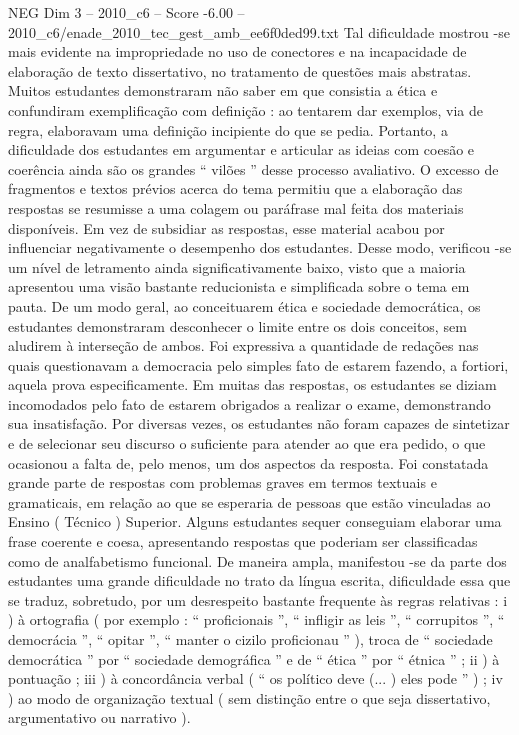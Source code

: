 \begin{textsample}{NEG Dim 3 – 2010\_c6 – Score -6.00 – 2010\_c6/enade\_2010\_tec\_gest\_amb\_ee6f0ded99.txt}
Tal dificuldade mostrou -se mais evidente na impropriedade no uso de conectores e na incapacidade de elaboração de texto dissertativo, no tratamento de questões mais abstratas.
Muitos estudantes demonstraram não saber em que consistia a ética e confundiram exemplificação com definição : ao tentarem dar exemplos, via de regra, elaboravam uma definição incipiente do que se pedia.
Portanto, a dificuldade dos estudantes em argumentar e articular as ideias com coesão e coerência ainda são os grandes “ vilões ” desse processo avaliativo.
O excesso de fragmentos e textos prévios acerca do tema permitiu que a elaboração das respostas se resumisse a uma colagem ou paráfrase mal feita dos materiais disponíveis.
Em vez de subsidiar as respostas, esse material acabou por influenciar negativamente o desempenho dos estudantes.
Desse modo, verificou -se um nível de letramento ainda significativamente baixo, visto que a maioria apresentou uma visão bastante reducionista e simplificada sobre o tema em pauta.
De um modo geral, ao conceituarem ética e sociedade democrática, os estudantes demonstraram desconhecer o limite entre os dois conceitos, sem aludirem à interseção de ambos.
Foi expressiva a quantidade de redações nas quais questionavam a democracia pelo simples fato de estarem fazendo, a fortiori, aquela prova especificamente.
Em muitas das respostas, os estudantes se diziam incomodados pelo fato de estarem obrigados a realizar o exame, demonstrando sua insatisfação.
Por diversas vezes, os estudantes não foram capazes de sintetizar e de selecionar seu discurso o suficiente para atender ao que era pedido, o que ocasionou a falta de, pelo menos, um dos aspectos da resposta.
Foi constatada grande parte de respostas com problemas graves em termos textuais e gramaticais, em relação ao que se esperaria de pessoas que estão vinculadas ao Ensino ( Técnico ) Superior.
Alguns estudantes sequer conseguiam elaborar uma frase coerente e coesa, apresentando respostas que poderiam ser classificadas como de analfabetismo funcional.
De maneira ampla, manifestou -se da parte dos estudantes uma grande dificuldade no trato da língua escrita, dificuldade essa que se traduz, sobretudo, por um desrespeito bastante frequente às regras relativas : i ) à ortografia ( por exemplo : “ proficionais ”, “ infligir as leis ”, “ corrupitos ”, “ democrácia ”, “ opitar ”, “ manter o cizilo proficionau ” ), troca de “ sociedade democrática ” por “ sociedade demográfica ” e de “ ética ” por “ étnica ” ; ii ) à pontuação ; iii ) à concordância verbal ( “ os político deve (... ) eles pode ” ) ; iv ) ao modo de organização textual ( sem distinção entre o que seja dissertativo, argumentativo ou narrativo ).

\end{textsample}
